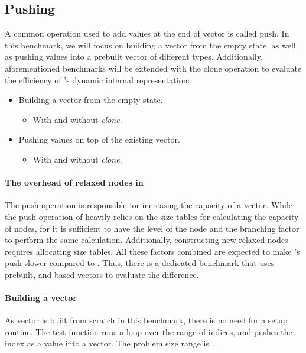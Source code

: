 \subsection{Pushing}
A common operation used to add values at the end of vector is called push. In this benchmark, we will focus on building a vector from the empty state, as well as pushing values into a prebuilt vector of different types. Additionally, aforementioned benchmarks will be extended with the clone operation to evaluate the efficiency of \pvec{}'s dynamic internal representation:
\begin{itemize}
    \item Building a vector from the empty state.    
    \begin{itemize}
        \item With and without \emph{clone}. 
    \end{itemize}
    \item Pushing values on top of the existing vector.
    \begin{itemize}
        \item With and without \emph{clone}. 
    \end{itemize}
\end{itemize}

\paragraph*{The overhead of relaxed nodes in \rrbtree{}}
The push operation is responsible for increasing the capacity of a vector. While the push operation of \rrbtree{} heavily relies on the size tables for calculating the capacity of nodes, for \rbtree{} it is sufficient to have the level of the node and the branching factor to perform the same calculation. Additionally, constructing new relaxed nodes requires allocating size tables. All these factors combined are expected to make \rrbtree{}'s push slower compared to \rbtree{}. Thus, there is a dedicated benchmark that uses prebuilt, \rrbtree{} and \rbtree{} based vectors to evaluate the difference.  

\paragraph*{Building a vector}
As vector is built from scratch in this benchmark, there is no need for a setup routine. The test function runs a loop over the \range{[0, N)} range of indices, and pushes the index as a value into a vector. The problem size range is \range{[10, 1m]}. 

